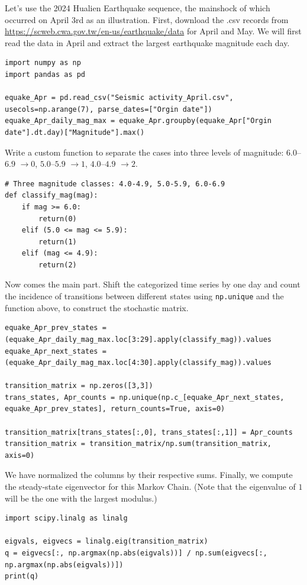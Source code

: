Let's use the 2024 Hualien Earthquake sequence, the mainshock of which occurred on April 3rd as an illustration. First, download the .csv records from \href{https://scweb.cwa.gov.tw/en-us/earthquake/data}{https://scweb.cwa.gov.tw/en-us/earthquake/data} for April and May. We will first read the data in April and extract the largest earthquake magnitude each day.
\begin{lstlisting}
import numpy as np
import pandas as pd

equake_Apr = pd.read_csv("Seismic activity_April.csv", usecols=np.arange(7), parse_dates=["Orgin date"])
equake_Apr_daily_mag_max = equake_Apr.groupby(equake_Apr["Orgin date"].dt.day)["Magnitude"].max()
\end{lstlisting}
Write a custom function to separate the cases into three levels of magnitude: $6.0$--$6.9$ $\to 0$, $5.0$--$5.9$ $\to 1$, $4.0$--$4.9$ $\to 2$.
\begin{lstlisting}
# Three magnitude classes: 4.0-4.9, 5.0-5.9, 6.0-6.9
def classify_mag(mag):
    if mag >= 6.0:
        return(0)
    elif (5.0 <= mag <= 5.9):
        return(1)
    elif (mag <= 4.9):
        return(2)
\end{lstlisting}
Now comes the main part. Shift the categorized time series by one day and count the incidence of transitions between different states using \verb|np.unique| and the function above, to construct the stochastic matrix.
\begin{lstlisting}
equake_Apr_prev_states = (equake_Apr_daily_mag_max.loc[3:29].apply(classify_mag)).values
equake_Apr_next_states = (equake_Apr_daily_mag_max.loc[4:30].apply(classify_mag)).values

transition_matrix = np.zeros([3,3])
trans_states, Apr_counts = np.unique(np.c_[equake_Apr_next_states, equake_Apr_prev_states], return_counts=True, axis=0)

transition_matrix[trans_states[:,0], trans_states[:,1]] = Apr_counts
transition_matrix = transition_matrix/np.sum(transition_matrix, axis=0)
\end{lstlisting}
We have normalized the columns by their respective sums. Finally, we compute the steady-state eigenvector for this Markov Chain. (Note that the eigenvalue of $1$ will be the one with the largest modulus.)
\begin{lstlisting}
import scipy.linalg as linalg

eigvals, eigvecs = linalg.eig(transition_matrix)
q = eigvecs[:, np.argmax(np.abs(eigvals))] / np.sum(eigvecs[:, np.argmax(np.abs(eigvals))])
print(q)
\end{lstlisting}
